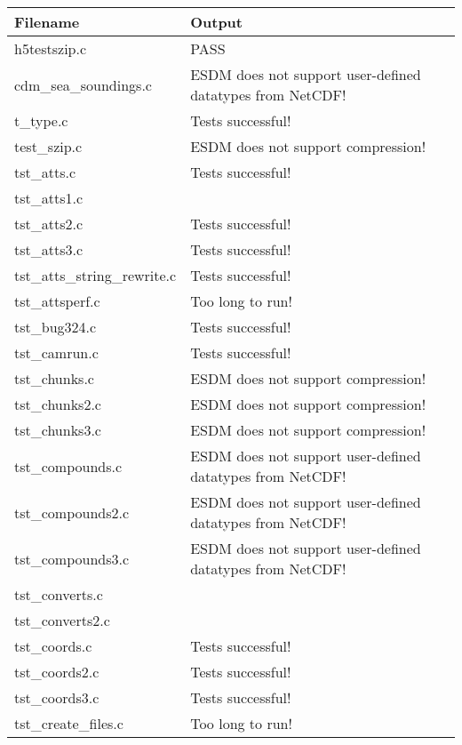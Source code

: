 \begin{table}[H]
\centering
\begin{tabular}{|l|l|}
\hline
Filename & Output \\ \hline \hline
h5testszip.c   & PASS   \\ \hline
cdm\_sea\_soundings.c   & ESDM does not support user-defined datatypes from NetCDF!          \\ \hline
t\_type.c   & Tests successful!   \\ \hline
test\_szip.c   &  ESDM does not support compression!         \\ \hline
tst\_atts.c   &   Tests successful!        \\ \hline
tst\_atts1.c   &           \\ \hline
tst\_atts2.c   &  Tests successful!         \\ \hline
tst\_atts3.c   &  Tests successful!         \\ \hline
tst\_atts\_string\_rewrite.c   & Tests successful!  \\ \hline
tst\_attsperf.c   &  Too long to run!         \\ \hline
tst\_bug324.c   &  Tests successful!         \\ \hline
tst\_camrun.c   &  Tests successful!         \\ \hline
tst\_chunks.c   &  ESDM does not support compression!       \\ \hline
tst\_chunks2.c   &  ESDM does not support compression!         \\ \hline
tst\_chunks3.c   & ESDM does not support compression!       \\ \hline
tst\_compounds.c   &  ESDM does not support user-defined datatypes from NetCDF!         \\ \hline
tst\_compounds2.c   &  ESDM does not support user-defined datatypes from NetCDF!         \\ \hline
tst\_compounds3.c   &  ESDM does not support user-defined datatypes from NetCDF!         \\ \hline
tst\_converts.c   &           \\ \hline
tst\_converts2.c   &           \\ \hline
tst\_coords.c   &  Tests successful!         \\ \hline
tst\_coords2.c   &  Tests successful!        \\ \hline
tst\_coords3.c   &  Tests successful!         \\ \hline
tst\_create\_files.c   &  Too long to run!        \\ \hline

\end{tabular}
\end{table}
